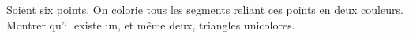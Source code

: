 Soient six points. On colorie tous les segments reliant ces points en deux couleurs. Montrer qu'il existe un, et même deux, triangles unicolores.
